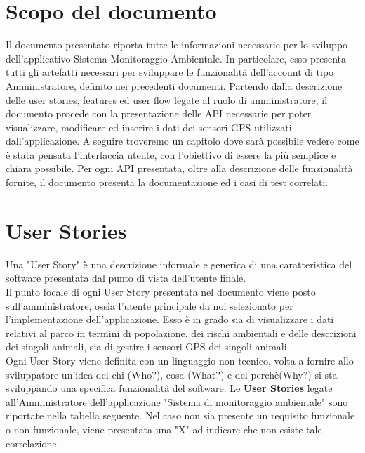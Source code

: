 \chapter*{Scopo del documento}
Il documento presentato riporta tutte le informazioni necessarie per lo sviluppo dell'applicativo Sistema Monitoraggio Ambientale. In particolare, esso presenta tutti gli artefatti necessari per sviluppare le funzionalità dell'account di tipo Amministratore, definito nei precedenti documenti. Partendo dalla descrizione delle user stories, features ed user flow legate al ruolo di amministratore, il documento procede con la presentazione delle API necessarie per poter visualizzare, modificare ed inserire i dati dei sensori GPS utilizzati dall'applicazione. A seguire troveremo un capitolo  dove sarà possibile vedere come è stata pensata l'interfaccia utente, con l'obiettivo di essere la più semplice e chiara possibile.
Per ogni API presentata, oltre alla descrizione delle funzionalità fornite, il documento presenta la documentazione ed i casi di test correlati.


\chapter{User Stories}

Una "User Story" è una descrizione informale e generica di una caratteristica del software presentata dal punto di vista dell'utente finale.\\
Il punto focale di ogni User Story presentata nel documento viene posto sull'amministratore, ossia l'utente principale da noi selezionato per l'implementazione dell'applicazione. Esso è in grado sia di visualizzare i dati relativi al parco in termini di popolazione, dei rischi ambientali e delle descrizioni dei singoli animali, sia di gestire i sensori GPS dei singoli animali. \\
Ogni User Story viene definita con un linguaggio non tecnico, volta a fornire allo sviluppatore un'idea del chi (Who?), cosa (What?) e del perchè(Why?) si sta sviluppando una specifica funzionalità del software.
Le \textbf{User Stories} legate all'Amministratore dell'applicazione "Sistema di monitoraggio ambientale" sono riportate nella tabella seguente. Nel caso non sia presente un requisito funzionale o non funzionale, viene presentata una "X" ad indicare che non esiste tale correlazione.\\

